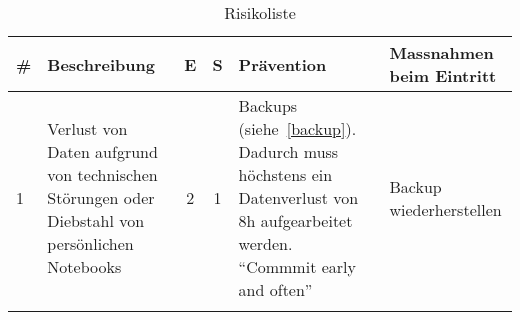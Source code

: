 \begin{longtable}{l X c c X X} 
	\toprule
	\# & Beschreibung & E & S & Prävention & Massnahmen beim Eintritt \tabularnewline
	\midrule
	1 & Verlust von Daten aufgrund von technischen Störungen oder Diebstahl von persönlichen Notebooks & 2 & 1 & Backups (siehe~\ref{backup}). Dadurch muss höchstens ein Datenverlust von 8h aufgearbeitet werden. \enquote{Commmit early and often} & Backup wiederherstellen \tabularnewline
	\midrule
	\bottomrule
	\caption{Risikoliste}
\end{longtable}